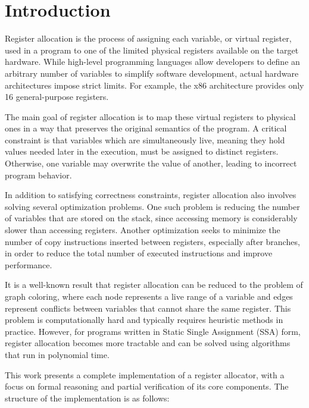 
\chapter{Introduction}
\label{cha:intro}

Register allocation is the process of assigning each variable, or virtual register, used in a program to one of the limited physical registers available on the target hardware. While high-level programming languages allow developers to define an arbitrary number of variables to simplify software development, actual hardware architectures impose strict limits. For example, the x86 architecture provides only 16 general-purpose registers.

The main goal of register allocation is to map these virtual registers to physical ones in a way that preserves the original semantics of the program. A critical constraint is that variables which are simultaneously live, meaning they hold values needed later in the execution, must be assigned to distinct registers. Otherwise, one variable may overwrite the value of another, leading to incorrect program behavior.

In addition to satisfying correctness constraints, register allocation also involves solving several optimization problems. One such problem is reducing the number of variables that are stored on the stack, since accessing memory is considerably slower than accessing registers. Another optimization seeks to minimize the number of copy instructions inserted between registers, especially after branches, in order to reduce the total number of executed instructions and improve performance.

It is a well-known result that register allocation can be reduced to the problem of graph coloring, where each node represents a live range of a variable and edges represent conflicts between variables that cannot share the same register. This problem is computationally hard and typically requires heuristic methods in practice. However, for programs written in Static Single Assignment (SSA) form, register allocation becomes more tractable and can be solved using algorithms that run in polynomial time.

This work presents a complete implementation of a register allocator, with a focus on formal reasoning and partial verification of its core components. The structure of the implementation is as follows:

